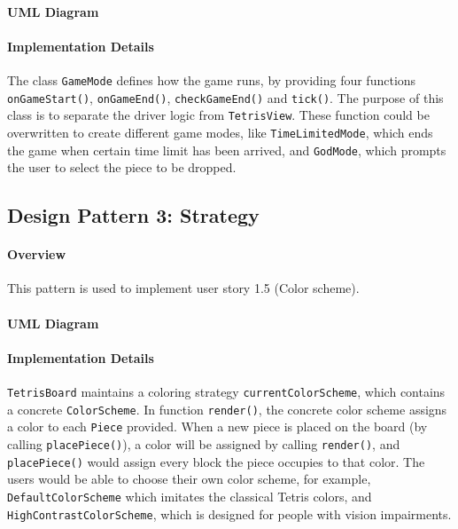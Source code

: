 \documentclass{article}
\begin{document}
\paragraph{UML Diagram}\hfill

\begin{figure}[H]
    
\end{figure}

\paragraph{Implementation Details}

The class \verb`GameMode` defines how the game runs, by providing four functions \verb`onGameStart()`, \verb`onGameEnd()`, \verb`checkGameEnd()` and \verb`tick()`. The purpose of this class is to separate the driver logic from \verb`TetrisView`. These function could be overwritten to create different game modes, like \verb`TimeLimitedMode`, which ends the game when certain time limit has been arrived, and \verb`GodMode`, which prompts the user to select the piece to be dropped.

\clearpage

\subsection{Design Pattern 3: Strategy}

\paragraph{Overview}
This pattern is used to implement user story 1.5 (Color scheme).

\paragraph{UML Diagram}\hfill

\begin{figure}[H]
    
\end{figure}

\paragraph{Implementation Details}

\verb`TetrisBoard` maintains a coloring strategy \verb`currentColorScheme`, which contains a concrete
\verb`ColorScheme`. In function \verb`render()`, the concrete color scheme assigns a color to each \verb`Piece` provided. When a new piece is placed on the board (by calling \verb`placePiece()`), a color will be assigned by calling \verb`render()`, and \verb`placePiece()` would assign every block the piece occupies to that color. The users would be able to choose their own color scheme, for example, \verb`DefaultColorScheme` which imitates the classical Tetris colors, and \verb`HighContrastColorScheme`, which is designed for people with vision impairments.
\end{document}
